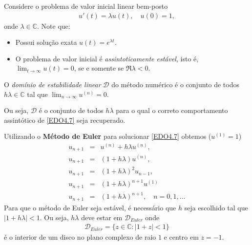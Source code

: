 Considere o problema de valor inicial linear bem-posto
\begin{eqnarray}\label{EDO4.7}
  u'(t)= \lambda u(t), \quad  u(0)=1,
\end{eqnarray}
onde $\lambda  \in  \mathbb{C}$. Note que:
\begin{itemize}
\item Possui solução exata $u(t)=e^{\lambda t}.$
\item O problema de valor inicial é \emph{assintoticamente estável}, isto é, $\lim_{t\rightarrow \infty }u(t)=0$, se e somente se $\Re{\lambda }<0$.
\
\end{itemize}




\begin{defn}
O \emph{domínio de estabilidade linear} $\mathcal D$ do método numérico é o conjunto de todos $h\lambda  \in  \mathbb{C}$ tal que $\lim_{n\rightarrow \infty }u^{(n)}=0$.
\end{defn}

Ou seja, $\mathcal D$ é o conjunto de todos $h\lambda $ para o qual o correto comportamento assintótico de \eqref{EDO4.7} seja recuperado.



\begin{ex}
Utilizando o \textbf{Método de Euler} para solucionar \eqref{EDO4.7} obtemos ($u^{(1)}=1$)
\begin{eqnarray}
 u_{n+1}   & =& u^{(n)}+h\lambda u^{(n)}, \\
 u_{n+1}   & =& (1+h\lambda )u^{(n)}, \\
 u_{n+1}   & =& (1+h\lambda )^2u_{n-1}, \\
 u_{n+1}   & =& (1+h\lambda )^{n+1}u^{(1)} \\
 u_{n+1}   & =& (1+h\lambda )^{n+1}  , \quad  n=0,1,\ldots
\end{eqnarray}
Para que o método de Euler seja estável, é necessário que $h$ seja escolhido tal que $|1+h\lambda |<1$. Ou seja, $h\lambda $ deve estar em $\mathcal D_{Euler}$ onde
\begin{eqnarray}
 \mathcal D_{Euler} = \{z \in  \mathbb{C}: |1+z|<1\}
\end{eqnarray}
é o interior de um disco no plano complexo de raio $1$ e centro em $z=-1$.%
\end{ex}


